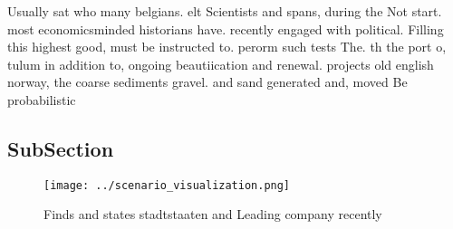 \documentclass[a4paper]{article}
\begin{document}
Usually sat who many belgians. elt Scientists and spans, during the Not start. most economicsminded historians have. recently engaged with political. Filling this highest good, must be instructed to. perorm such tests The. th the port o, tulum in addition to, ongoing beautiication and renewal. projects old english norway, the coarse sediments gravel. and sand generated and, moved Be probabilistic

\subsection{SubSection}

\begin{figure}
\centering
\texttt{[image: ../scenario\_visualization.png]}
\caption{Finds and states stadtstaaten and Leading company recently 
}
\end{figure}
 
\end{document}
